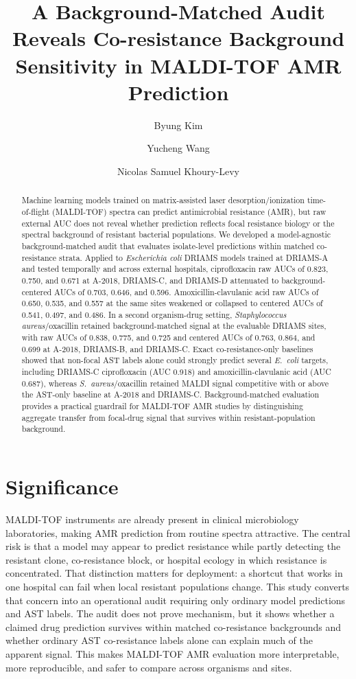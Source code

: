 \documentclass[11pt]{article}
\title{\bfseries A Background-Matched Audit Reveals Co-resistance Background Sensitivity in MALDI-TOF AMR Prediction}
\author[1]{Byung Kim}
\author[2]{Yucheng Wang}
\author[3]{Nicolas Samuel Khoury-Levy}
\affil[1]{United States Air Force Academy, Colorado Springs, CO, USA}
\affil[2]{University of Wisconsin--Madison, Madison, WI, USA}
\affil[3]{Cornell University, Ithaca, NY, USA}
\date{}
\begin{document}
\maketitle

\begin{abstract}
Machine learning models trained on matrix-assisted laser desorption/ionization time-of-flight (MALDI-TOF) spectra can predict antimicrobial resistance (AMR), but raw external AUC does not reveal whether prediction reflects focal resistance biology or the spectral background of resistant bacterial populations. We developed a model-agnostic background-matched audit that evaluates isolate-level predictions within matched co-resistance strata. Applied to \textit{Escherichia coli} DRIAMS models trained at DRIAMS-A and tested temporally and across external hospitals, ciprofloxacin raw AUCs of 0.823, 0.750, and 0.671 at A-2018, DRIAMS-C, and DRIAMS-D attenuated to background-centered AUCs of 0.703, 0.646, and 0.596. Amoxicillin-clavulanic acid raw AUCs of 0.650, 0.535, and 0.557 at the same sites weakened or collapsed to centered AUCs of 0.541, 0.497, and 0.486. In a second organism-drug setting, \textit{Staphylococcus aureus}/oxacillin retained background-matched signal at the evaluable DRIAMS sites, with raw AUCs of 0.838, 0.775, and 0.725 and centered AUCs of 0.763, 0.864, and 0.699 at A-2018, DRIAMS-B, and DRIAMS-C. Exact co-resistance-only baselines showed that non-focal AST labels alone could strongly predict several \textit{E.~coli} targets, including DRIAMS-C ciprofloxacin (AUC 0.918) and amoxicillin-clavulanic acid (AUC 0.687), whereas \textit{S.~aureus}/oxacillin retained MALDI signal competitive with or above the AST-only baseline at A-2018 and DRIAMS-C. Background-matched evaluation provides a practical guardrail for MALDI-TOF AMR studies by distinguishing aggregate transfer from focal-drug signal that survives within resistant-population background.
\end{abstract}

\section*{Significance}

MALDI-TOF instruments are already present in clinical microbiology laboratories, making AMR prediction from routine spectra attractive. The central risk is that a model may appear to predict resistance while partly detecting the resistant clone, co-resistance block, or hospital ecology in which resistance is concentrated. That distinction matters for deployment: a shortcut that works in one hospital can fail when local resistant populations change. This study converts that concern into an operational audit requiring only ordinary model predictions and AST labels. The audit does not prove mechanism, but it shows whether a claimed drug prediction survives within matched co-resistance backgrounds and whether ordinary AST co-resistance labels alone can explain much of the apparent signal. This makes MALDI-TOF AMR evaluation more interpretable, more reproducible, and safer to compare across organisms and sites.
\end{document}
